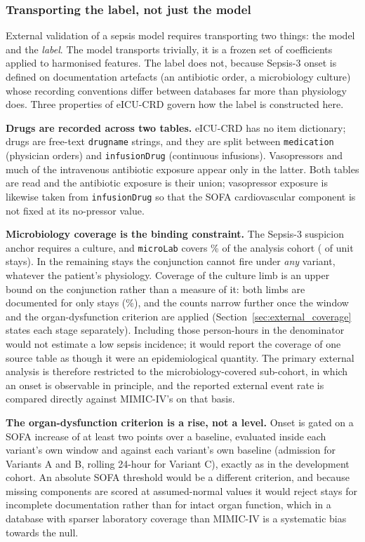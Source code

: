 \subsubsection{Transporting the label, not just the model}
\label{sec:label_transport}

External validation of a sepsis model requires transporting two things: the
model and the \emph{label}. The model transports trivially, it is a frozen
set of coefficients applied to harmonised features. The label does not, because
Sepsis-3 onset is defined on documentation artefacts (an antibiotic order, a
microbiology culture) whose recording conventions differ between databases far
more than physiology does. Three properties of eICU-CRD govern how the label is
constructed here.

\textbf{Drugs are recorded across two tables.} eICU-CRD has no item
dictionary; drugs are free-text \texttt{drugname} strings, and they are split
between \texttt{medication} (physician orders) and \texttt{infusionDrug}
(continuous infusions). Vasopressors and much of the intravenous antibiotic
exposure appear only in the latter. Both tables are read and the antibiotic
exposure is their union; vasopressor exposure is likewise taken from
\texttt{infusionDrug} so that the SOFA cardiovascular component is not fixed at
its no-pressor value.

\textbf{Microbiology coverage is the binding constraint.} The Sepsis-3
suspicion anchor requires a culture, and \texttt{microLab} covers
\pcExtMicroCoverage\% of the analysis cohort (\pcExtNMicroStays{} of
\pcExtNCohortStays{} unit stays). In the remaining stays the conjunction cannot
fire under \emph{any} variant, whatever the patient's physiology. Coverage of
the culture limb is an upper bound on the conjunction rather than a measure of
it: both limbs are documented for only \pcExtNBothLimbStays{} stays
(\pcExtBothLimbCoverage\%), and the counts narrow further once the window and
the organ-dysfunction criterion are applied
(Section~\ref{sec:external_coverage} states each stage separately). Including
those person-hours in the denominator would not estimate a low sepsis
incidence; it would report the coverage of one source table as though it were
an epidemiological quantity. The primary external analysis is therefore
restricted to the microbiology-covered sub-cohort, in which an onset is
observable in principle, and the reported external event rate is compared
directly against MIMIC-IV's on that basis.

\textbf{The organ-dysfunction criterion is a rise, not a level.} Onset is
gated on a SOFA increase of at least two points over a baseline, evaluated
inside each variant's own window and against each variant's own baseline
(admission for Variants A and B, rolling 24-hour for Variant C), exactly as in
the development cohort. An absolute SOFA threshold would be a different
criterion, and because missing components are scored at assumed-normal values
it would reject stays for incomplete documentation rather than for intact organ
function, which in a database with sparser laboratory coverage than MIMIC-IV
is a systematic bias towards the null.

